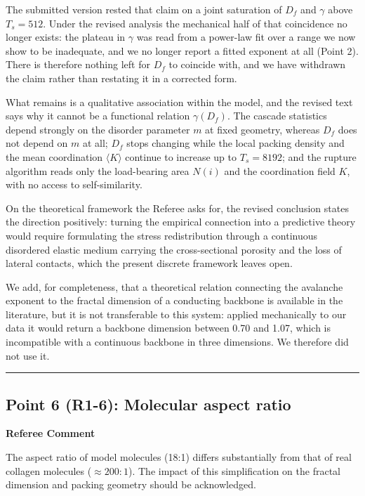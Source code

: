 \documentclass[11pt]{article}
\newenvironment{refereecomment}
  {%
    \par
    \begingroup
    \color{commentgray}
    \itshape
    \setlength{\leftskip}{1.4em}
    \setlength{\rightskip}{1.4em}
  }
  {%
    \par
    \endgroup
  }
\newcommand{\refereelabel}{%
  \par\smallskip
  {\color{commentgray}\bfseries Referee Comment}\par
}
\newcommand{\pointseparator}{%
  \par\bigskip
  {\color{rulegray}\hrule}
  \par\bigskip
}
\begin{document}
The submitted version rested that claim on a joint saturation of $D_f$ and
$\gamma$ above $T_s=512$. Under the revised analysis the mechanical half of that
coincidence no longer exists: the plateau in $\gamma$ was read from a power-law
fit over a range we now show to be inadequate, and we no longer report a fitted
exponent at all (Point 2). There is therefore nothing left for $D_f$ to coincide
with, and we have withdrawn the claim rather than restating it in a corrected
form.

What remains is a qualitative association within the model, and the revised text
says why it cannot be a functional relation $\gamma(D_f)$. The cascade
statistics depend strongly on the disorder parameter $m$ at fixed geometry,
whereas $D_f$ does not depend on $m$ at all; $D_f$ stops changing while the
local packing density and the mean coordination $\langle K\rangle$ continue to
increase up to $T_s=8192$; and the rupture algorithm reads only the load-bearing
area $N(i)$ and the coordination field $K$, with no access to self-similarity.

On the theoretical framework the Referee asks for, the revised conclusion states
the direction positively: turning the empirical connection into a predictive
theory would require formulating the stress redistribution through a continuous
disordered elastic medium carrying the cross-sectional porosity and the loss of
lateral contacts, which the present discrete framework leaves open.

We add, for completeness, that a theoretical relation connecting the avalanche
exponent to the fractal dimension of a conducting backbone is available in the
literature, but it is not transferable to this system: applied mechanically to
our data it would return a backbone dimension between 0.70 and 1.07, which is
incompatible with a continuous backbone in three dimensions. We therefore did
not use it.


\pointseparator


\subsection*{Point 6 (R1-6): Molecular aspect ratio}

\refereelabel
\begin{refereecomment}
  The aspect ratio of model molecules (18:1) differs substantially from that of
  real collagen molecules (\(\approx 200{:}1\)). The impact of this
  simplification on the fractal dimension and packing geometry should be
  acknowledged.
\end{refereecomment}
\end{document}
